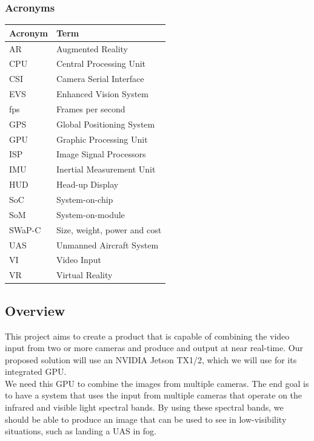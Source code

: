 \documentclass[letterpaper,10pt,serif,draftclsnofoot,onecolumn,compsoc,titlepage]{IEEEtran}
\begin{document}
\subsubsection{Acronyms}

\begin{tabular}{|l|l|}
	\hline
	\textbf{Acronym} & \textbf{Term}\\
	\hline
	AR & Augmented Reality\\
	\hline
	CPU & Central Processing Unit\\
	\hline
	CSI & Camera Serial Interface\\
	\hline
	EVS & Enhanced Vision System\\
	\hline
	fps & Frames per second\\
	\hline
	GPS & Global Positioning System\\
	\hline
	GPU & Graphic Processing Unit\\
	\hline
	ISP & Image Signal Processors\\
	\hline
	IMU & Inertial Measurement Unit\\
	\hline
	HUD & Head-up Display\\
	\hline
	SoC & System-on-chip\\
	\hline
	SoM & System-on-module\\
	\hline
	SWaP-C & Size, weight, power and cost\\
	\hline
	UAS & Unmanned Aircraft System\\
	\hline
	VI & Video Input\\
	\hline
	VR & Virtual Reality\\
	\hline
\end{tabular}

\subsection{Overview}

This project aims to create a product that is capable of combining the video input from 
two or more cameras and produce and output at near real-time. Our proposed solution 
will use an NVIDIA Jetson TX1/2, which we will use for its integrated GPU.\\

We need this GPU to combine the images from multiple cameras. The end goal is to have 
a system that uses the input from multiple cameras that operate on the infrared and 
visible light spectral bands. By using these spectral bands, we should be able to 
produce an image that can be used to see in low-visibility situations, such as landing 
a UAS in fog.\\
\end{document}
